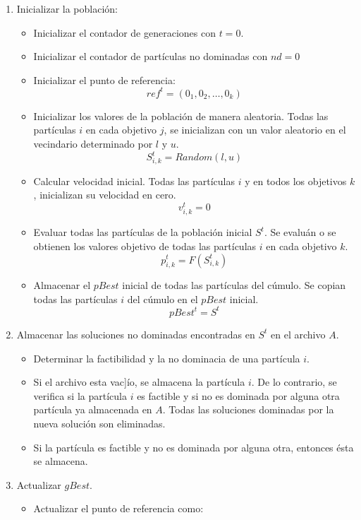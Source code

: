 \begin{enumerate}
\item Inicializar la poblaci\'on: 
      \begin{itemize}
      \item Inicializar el contador de generaciones con $t = 0$.
      \item Inicializar el contador de part\'iculas no dominadas con $nd=0$
      \item Inicializar el punto de referencia:    
      \[ref^t = \left(0_1, 0_2, \ldots, 0_k\right)\]
      \item Inicializar los valores de la poblaci\'on de manera aleatoria. Todas las part\'iculas $i$ en cada objetivo $j$,        
      se inicializan con un valor aleatorio en el vecindario determinado por $l$ y $u$.  
      \[S^t_{i,k} = Random(l, u)\]
      \item Calcular velocidad inicial. Todas las part\'iculas $i$ y en todos los objetivos $k$, inicializan su velocidad en cero.
      \[v^t_{i,k} = 0\]
      \item Evaluar todas las part\'iculas de la poblaci\'on inicial $S^t$. Se evalu\'an o se obtienen los valores objetivo de 
      todas las part\'iculas $i$ en  cada objetivo $k$. 
      \[p^t_{i,k} = F \left(S^t_{i,k} \right)\] 
      \item Almacenar el $pBest$ inicial de todas las part\'iculas del c\'umulo. Se copian todas las part\'iculas $i$ del c\'umulo 
      en el $pBest$ inicial. 
      \[pBest^t = S^t\] 
      \end{itemize}
\item Almacenar las soluciones no dominadas encontradas en $S^t$ en el archivo $A$.
      \begin{itemize}
      \item Determinar la factibilidad y la no dominacia de una part\'icula $i$.       
      \item Si el archivo esta vac]\'io, se almacena la part\'icula $i$. De lo contrario, se verifica si la part\'icula $i$ es factible 
      y si no es dominada por alguna otra part\'icula ya almacenada en $A$. Todas las soluciones dominadas por la nueva 
      soluci\'on son eliminadas. 
      \item Si la part\'icula es factible y no es dominada por alguna otra, entonces \'esta se almacena. 
      \end{itemize}
\item Actualizar $gBest$. 
      \begin{itemize}
      \item Actualizar el punto de referencia como:
      

\end{itemize}
\end{enumerate}
